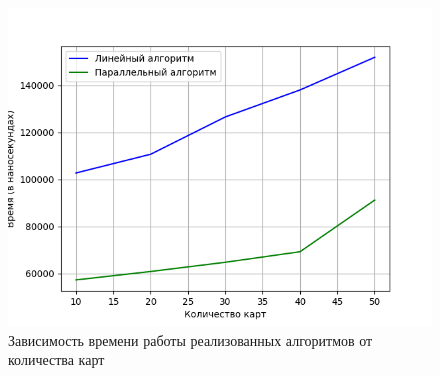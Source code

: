 \begin{figure}	\centering
	\includegraphics[width=150mm]{images/result}
	\captionsetup{justification=centering}
	\centering\caption{Зависимость времени работы реализованных алгоритмов от количества карт}
	\label{img:result}
\end{figure}
